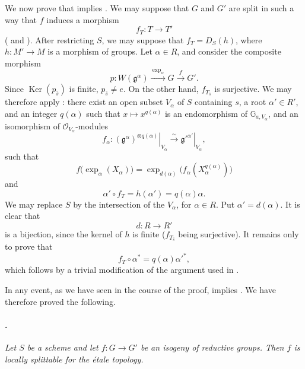 We now prove that \textup{} implies \textup{}. We may
suppose that \(G\) and \(G'\) are split in such a way that \(f\)
induces a morphism
\[
  f_T:T\longrightarrow T'
\]
\textup{( and )}. After restricting \(S\), we may
suppose that \(f_T=D_S(h)\), where \(h:M'\to M\) is a morphism of
groups. Let \(\alpha\in R\), and consider the composite morphism
\[
  p:
  W(\mathfrak g^\alpha)
  \xrightarrow{\ \exp_\alpha\ }
  G
  \xrightarrow{\ f\ }
  G'.
\]
Since \(\operatorname{Ker}(p_{\bar s})\) is finite,
\(p_{\bar s}\ne e\). On the other hand, \(f_{T_{\bar s}}\) is
surjective. We may therefore apply : there exist an open
subset \(V_\alpha\) of \(S\) containing \(s\), a root
\(\alpha'\in R'\), and an integer \(q(\alpha)\) such that
\(x\mapsto x^{q(\alpha)}\) is an endomorphism of
\(\mathbb G_{a,V_\alpha}\), and an isomorphism of
\(\mathcal O_{V_\alpha}\)-modules
\[
  f_\alpha:
  \left.(\mathfrak g^\alpha)^{\otimes q(\alpha)}
  \right|_{V_\alpha}
  \xrightarrow{\ \sim\ }
  \left.\mathfrak g'^{\alpha'}\right|_{V_\alpha},
\]
such that
\[
  f\bigl(\exp_\alpha(X_\alpha)\bigr)
  =
  \exp_{d(\alpha)}
  \bigl(f_\alpha(X_\alpha^{q(\alpha)})\bigr)
\]
and
\[
  \alpha'\circ f_T=h(\alpha')=q(\alpha)\alpha.
\]
We may replace \(S\) by the intersection of the \(V_\alpha\), for
\(\alpha\in R\). Put \(\alpha'=d(\alpha)\). It is clear that
\[
  d:R\longrightarrow R'
\]
is a bijection, since the kernel of \(h\) is finite
\textup{(\(f_{T_{\bar s}}\) being surjective)}. It remains only to
prove that
\[
  f_T\circ\alpha^*=q(\alpha)\alpha'^*,
\]
which follows by a trivial modification of the argument used in
.

In any event, as we have seen in the course of the proof,
\textup{} implies \textup{}. We have therefore proved the
following.

\paragraph{.}
\textit{Let \(S\) be a scheme and let \(f:G\to G'\) be an isogeny
of reductive groups. Then \(f\) is locally splittable for the
étale topology.}

